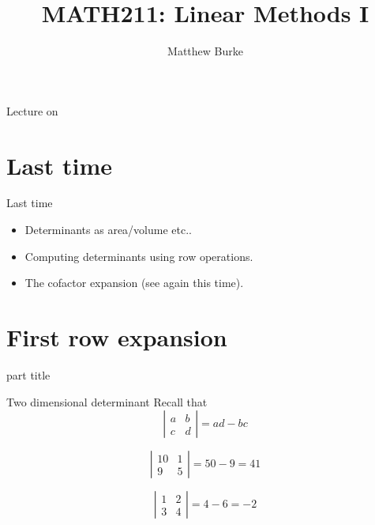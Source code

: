 \documentclass{beamer}
\title{MATH211: Linear Methods I}
\author{Matthew Burke}
\date{\lectureDate}
\newcommand{\lectureDate}{\formatdate{02}{10}{2018}}
\begin{document}
\frame{\titlepage}

\begin{frame}{Lecture on \lectureDate}
  \tableofcontents
\end{frame}

\section*{Last time}
\label{sec:Last-time}

\begin{frame}{Last time}
  \begin{itemize}
  \item Determinants as area/volume etc..\vfill
  \item Computing determinants using row operations.\vfill
  \item The cofactor expansion (see again this time).
  \end{itemize}
\end{frame}

\section{First row expansion}

\begin{frame}
  \begin{beamercolorbox}[sep=12pt,center]{part title}
    \insertsection\par
  \end{beamercolorbox}
\end{frame}

\begin{frame}{Two dimensional determinant}
  Recall that
  \begin{equation*}
    \left|
      \begin{array}{cc}
	a&b\\
        c&d
      \end{array}
    \right| = ad-bc
  \end{equation*}
  \begin{example}
    \begin{equation*}
      \left|
	\begin{array}{cc}
          10&1\\
          9&5
	\end{array}
      \right| = 50-9 = 41
    \end{equation*}
  \end{example}
  \begin{example}
    \begin{equation*}
      \left|
	\begin{array}{cc}
          1&2\\
          3&4
	\end{array}
      \right|= 4-6 = -2
    \end{equation*}
  \end{example}
\end{frame}
\end{document}
